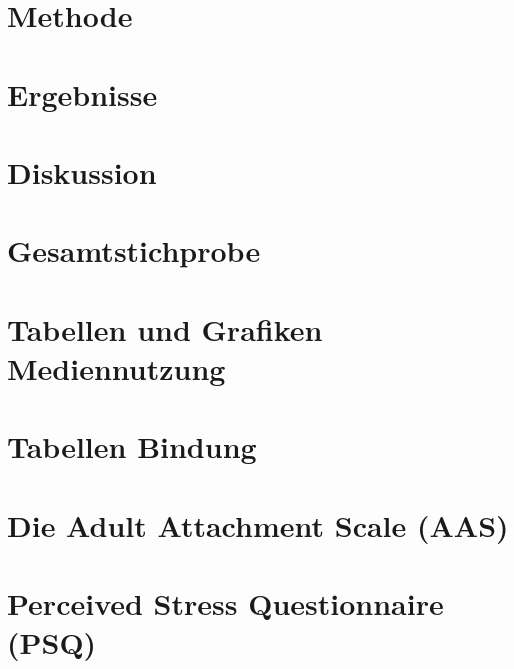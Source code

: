 \section{Methode}\label{sec:Methode}


\section{Ergebnisse}\label{sec:Ergebnisse}


\section{Diskussion}\label{sec:Diskussion}


\begin{flushleft}
\nocite{}
{}
\end{flushleft}

\newpage

\appendix 
\renewcommand{\appendixname}{Anhang} 

\section{Gesamtstichprobe}\label{app:Gesamtstichprobe}

\newpage

\section{Tabellen und Grafiken Mediennutzung}\label{app:TablesMediennutzung}

\newpage

\section{Tabellen Bindung}\label{app:TablesAas}

\newpage

\section{Die Adult Attachment Scale (AAS)}\label{app:AAS}

\newpage

\section{Perceived Stress Questionnaire (PSQ)}\label{app:PSQ}

\newpage

